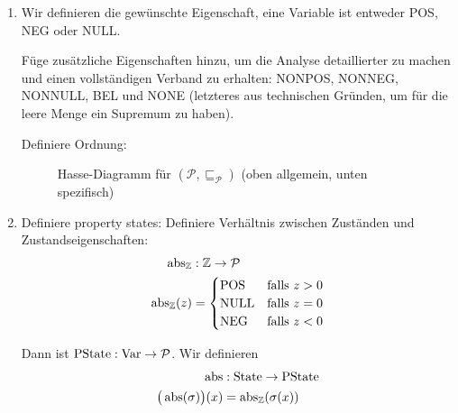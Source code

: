 \begin{enumerate}
    \item Wir definieren die gewünschte Eigenschaft, \dh{} eine Variable ist entweder POS, NEG oder NULL.

        Füge zusätzliche Eigenschaften hinzu, um die Analyse detaillierter zu machen und einen vollständigen Verband zu erhalten: NONPOS, NONNEG, NONNULL, BEL und NONE (letzteres aus technischen Gründen, um für die leere Menge ein Supremum zu haben).

        Definiere Ordnung:
        \begin{figure}[H]
            \centering
            \caption{Hasse-Diagramm für $(\mathcal{P}, \sqsubseteq_{\mathcal{P}})$ (oben allgemein, unten spezifisch)}
        \end{figure}

    \item Definiere property states: Definiere Verhältnis zwischen Zuständen und Zustandseigenschaften: \begin{align*}
            \operatorname{abs}_{\mathbb{Z}} & : \mathbb{Z} \to \mathcal{P} \\
            \operatorname{abs}_{\mathbb{Z}}(z) & = \begin{cases}
                \text{POS} & \text{falls } z > 0 \\
                \text{NULL} & \text{falls } z = 0 \\
                \text{NEG} & \text{falls } z < 0
            \end{cases}
        \end{align*}

        Dann ist $\operatorname{PState}: \operatorname{Var} \to \mathcal{P}$. Wir definieren \begin{align*}
            \operatorname{abs} & : \operatorname{State} \to \operatorname{PState} \\
            \big(\operatorname{abs}(\sigma)\big)(x) & = \operatorname{abs}_{\mathbb{Z}}(\sigma(x))
        \end{align*}


\end{enumerate}
